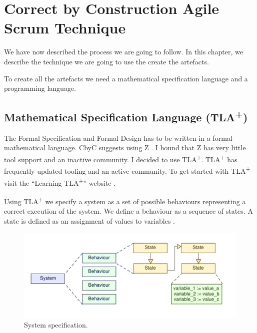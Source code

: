 
\chapter{Correct by Construction Agile Scrum Technique} %

\label{Chapter_Applying_the_methodology} %

We have now described the process we are going to follow. In this chapter, we describe 
the technique we are going to use the create the artefacts.

To create all the artefacts we need a mathematical specification language and a 
programming language.

\section{Mathematical Specification Language (TLA\textsuperscript{+})}

The Formal Specification and Formal Design has to be written in a formal
mathematical language. CbyC suggests using Z  \parencite{CbyCPraxis}. 
I hound that Z has very little tool support and an inactive community. I decided
to use TLA\textsuperscript{+}.  TLA\textsuperscript{+} has frequently updated 
tooling and an active community. To get started with TLA\textsuperscript{+}
visit the ``Learning TLA\textsuperscript{+}'' website \parencite{LearningTLA}.

Using TLA\textsuperscript{+} we specify a system as a set of possible behaviours 
representing a correct execution of the system. We define a behaviour as a sequence
of states. A state is defined as an assignment of values to variables \parencite{SpecifyingSystems}.

\begin{figure}[H]
	\centering
	\includegraphics[scale=0.75]{Figures/System_Specification.pdf}
	\decoRule
	\caption{System specification.}
	\label{fig:SysSpec}
\end{figure}

